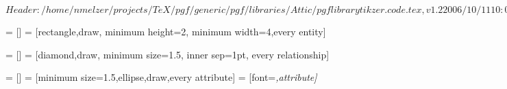 \ProvidesFileRCS[v\pgfversion] $Header: /home/nmelzer/projects/TeX/pgf/generic/pgf/libraries/Attic/pgflibrarytikzer.code.tex,v 1.2 2006/10/11 10:03:03 tantau Exp $

%




=           []
=                 [rectangle,draw,
                                     minimum height=2\baselineskip,
                                     minimum width=4\baselineskip,every entity]



=     []
=           [diamond,draw,
                                     minimum size=1.5\baselineskip,
                                     inner sep=1pt,
                                     every relationship]



=        []
=              [minimum size=1.5\baselineskip,ellipse,draw,every attribute]
=          [font=\itshape,attribute]




\endinput
